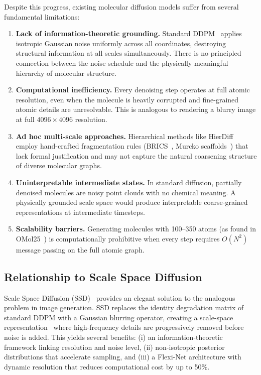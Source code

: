 \documentclass[12pt,a4paper]{article}
\begin{document}
Despite this progress, existing molecular diffusion models suffer from several fundamental limitations:

\begin{enumerate}[label=(\roman*)]
    \item \textbf{Lack of information-theoretic grounding.} Standard DDPM~\cite{ho2020ddpm} applies isotropic Gaussian noise uniformly across all coordinates, destroying structural information at all scales simultaneously. There is no principled connection between the noise schedule and the physically meaningful hierarchy of molecular structure.

    \item \textbf{Computational inefficiency.} Every denoising step operates at full atomic resolution, even when the molecule is heavily corrupted and fine-grained atomic details are unresolvable. This is analogous to rendering a blurry image at full $4096 \times 4096$ resolution.

    \item \textbf{Ad hoc multi-scale approaches.} Hierarchical methods like HierDiff~\cite{qiang2023hierdiff} employ hand-crafted fragmentation rules (BRICS~\cite{degen2008brics}, Murcko scaffolds~\cite{bemis1996murcko}) that lack formal justification and may not capture the natural coarsening structure of diverse molecular graphs.

    \item \textbf{Uninterpretable intermediate states.} In standard diffusion, partially denoised molecules are noisy point clouds with no chemical meaning. A physically grounded scale space would produce interpretable coarse-grained representations at intermediate timesteps.

    \item \textbf{Scalability barriers.} Generating molecules with 100--350 atoms (as found in OMol25~\cite{omol25}) is computationally prohibitive when every step requires $O(N^2)$ message passing on the full atomic graph.
\end{enumerate}

\subsection{Relationship to Scale Space Diffusion}

Scale Space Diffusion (SSD)~\cite{ssd2026} provides an elegant solution to the analogous problem in image generation. SSD replaces the identity degradation matrix of standard DDPM with a Gaussian blurring operator, creating a scale-space representation~\cite{lindeberg1994scalespace, witkin1987scalespace, koenderink1984structure} where high-frequency details are progressively removed before noise is added. This yields several benefits: (i) an information-theoretic framework linking resolution and noise level, (ii) non-isotropic posterior distributions that accelerate sampling, and (iii) a Flexi-Net architecture with dynamic resolution that reduces computational cost by up to 50\%.
\end{document}
